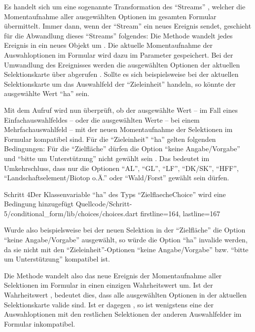 Es handelt sich um eine sogenannte Transformation des \enquote{Streams} , welcher die Momentaufnahme aller ausgewählten Optionen im gesamten Formular übermittelt.
Immer dann, wenn der \enquote{Stream}  ein neues Ereignis sendet,
geschieht für die Abwandlung dieses \enquote{Streams} folgendes:
Die Methode  wandelt jedes Ereignis in ein neues Objekt um .
Die aktuelle Momentaufnahme der Auswahloptionen im Formular wird dazu im Parameter  gespeichert.
Bei der Umwandlung des Ereignisses werden die ausgewählten Optionen der aktuellen Selektionskarte über  abgerufen .
Sollte es sich beispielsweise bei der aktuellen Selektionskarte um das Auswahlfeld der \enquote{Zieleinheit} handeln,
so könnte der ausgewählte Wert \enquote{ha} sein.

Mit dem Aufruf  wird nun überprüft, ob der ausgewählte Wert
-- im Fall eines Einfachauswahlfeldes --
oder die ausgewählten Werte
-- bei einem Mehrfachauswahlfeld --
mit der neuen Momentaufnahme der Selektionen im Formular kompatibel sind.
Für die \enquote{Zieleinheit} \enquote{ha} gelten folgenden Bedingungen:
Für die \enquote{Zielfläche} dürfen die Option \enquote{keine Angabe/Vorgabe} und
\enquote{bitte um Unterstützung} nicht gewählt sein .
Das bedeutet im Umkehrschluss,
dass nur die Optionen \enquote{AL},
\enquote{GL},
\enquote{LF},
\enquote{DK/SK},
\enquote{HFF},
\enquote{Landschaftselement/Biotop o.Ä.} 
oder \enquote{Wald/Forst} gewählt sein dürfen. 

\begin{alexlisting}{Schritt 4}{Der Klassenvariable \enquote{ha} des Typs \enquote{ZielflaecheChoice} wird eine Bedingung hinzugefügt}
  {Quellcode/Schritt-5/conditional_form/lib/choices/choices.dart}
  {firstline=164, lastline=167}
  \label{lst:Schritt5ha}
\end{alexlisting}

Wurde also beispielsweise bei der neuen Selektion in der \enquote{Zielfläche} die Option \enquote{keine Angabe/Vorgabe} ausgewählt,
so würde die Option \enquote{ha} invalide werden,
da sie nicht mit den \enquote{Zieleinheit}-Optionen \enquote{keine Angabe/Vorgabe} bzw. \enquote{bitte um Unterstützung}  kompatibel ist.

Die Methode   wandelt also das neue Ereignis der Momentaufnahme aller Selektionen im Formular in einen einzigen Wahrheitswert um.
Ist der Wahrheitswert ,
bedeutet dies,
dass alle ausgewählten Optionen in der aktuellen Selektionskarte valide sind.
Ist er dagegen , so ist wenigstens eine der Auswahloptionen mit den restlichen Selektionen der anderen Auswahlfelder im Formular inkompatibel.



